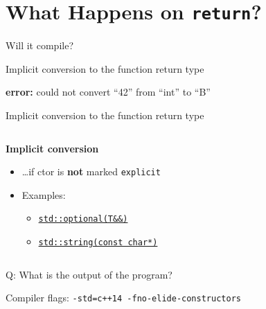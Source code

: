 \section{What Happens on \texttt{return}?}

\begin{frame}[fragile]{Will it compile?}
\end{frame}

\begin{frame}[fragile]{Implicit conversion to the function return type}

    \textbf{\textcolor{vertexDarkRed}{error:}} could not convert \enquote{42} from \enquote{int} to \enquote{B}
\end{frame}

\begin{frame}[fragile]{Implicit conversion to the function return type}
    \begin{columns}
        \begin{column}{.55\textwidth}
            \textbf{Implicit conversion}
            \begin{itemize}
                \item \ldots if ctor is \textbf{not} marked \texttt{explicit}
                \item Examples: 
                \begin{itemize}
                    \item \href{https://en.cppreference.com/w/cpp/utility/optional/optional}{\texttt{std::optional(T\&\&)}}
                    \item \href{https://en.cppreference.com/w/cpp/string/basic_string/basic_string}{\texttt{std::string(const char*)}}
                \end{itemize}
            \end{itemize}
        \end{column}
        \begin{column}{.35\textwidth}
        \end{column}
    \end{columns}
\end{frame}

\begin{frame}[fragile]{Q: What is the output of the program?}
    \begin{center}
        Compiler flags: \texttt{-std=c++14 -fno-elide-constructors}
    \end{center}

\end{frame}


